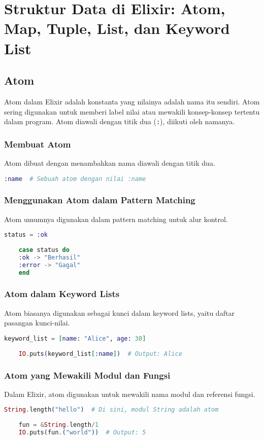 \chapter{Struktur Data di Elixir: Atom, Map, Tuple, List, dan Keyword List}

\section{Atom}
Atom dalam Elixir adalah konstanta yang nilainya adalah nama itu sendiri. Atom sering digunakan untuk memberi label nilai atau mewakili konsep-konsep tertentu dalam program. Atom diawali dengan titik dua (\texttt{:}), diikuti oleh namanya.

\subsection{Membuat Atom}
Atom dibuat dengan menambahkan nama diawali dengan titik dua.
\begin{lstlisting}[language=Elixir]
	:name  # Sebuah atom dengan nilai :name
\end{lstlisting}

\subsection{Menggunakan Atom dalam Pattern Matching}
Atom umumnya digunakan dalam pattern matching untuk alur kontrol.
\begin{lstlisting}[language=Elixir]
	status = :ok
	
	case status do
	:ok -> "Berhasil"
	:error -> "Gagal"
	end
\end{lstlisting}

\subsection{Atom dalam Keyword Lists}
Atom biasanya digunakan sebagai kunci dalam keyword lists, yaitu daftar pasangan kunci-nilai.
\begin{lstlisting}[language=Elixir]
	keyword_list = [name: "Alice", age: 30]
	
	IO.puts(keyword_list[:name])  # Output: Alice
\end{lstlisting}

\subsection{Atom yang Mewakili Modul dan Fungsi}
Dalam Elixir, atom digunakan untuk mewakili nama modul dan referensi fungsi.
\begin{lstlisting}[language=Elixir]
	String.length("hello")  # Di sini, modul String adalah atom
	
	fun = &String.length/1
	IO.puts(fun.("world"))  # Output: 5
\end{lstlisting}

